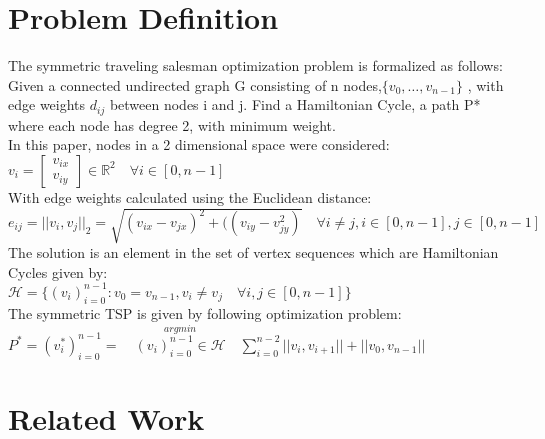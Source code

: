 \documentclass[format=sigconf]{acmart}
\begin{document}
\section*{Problem Definition}
The symmetric traveling salesman optimization problem is formalized as follows:\\
Given a connected undirected graph G consisting of n nodes,$\{v_0, \hdots, v_{n-1}\}$ , with edge weights $d_{ij}$ between nodes i and j.
Find a Hamiltonian Cycle, a path P* where each node has degree 2, with minimum weight.\\
In this paper, nodes in a 2 dimensional space were considered: $v_i = \begin{bmatrix}
v_{ix} \\ v_{iy} 
\end{bmatrix} \in \mathbb{R}^2 \quad \forall i \in [0,n-1]$\\
With edge weights calculated using the Euclidean distance: $e_{ij} = || v_i, v_j ||_2 = \sqrt{(v_{ix}-v_{jx})^2 + ((v_{iy}-v_{jy}^2)} \quad \forall i\neq j, i \in [0,n-1], j \in [0,n-1]$\\
The solution is an element in the set of vertex sequences which are Hamiltonian Cycles given by:\\
$\mathcal{H} = \{ (v_i)_{i=0}^{n-1} : v_0 = v_{n-1}, v_i \neq v_j \quad \forall i,j \in [0,n-1]\}$\\
The symmetric TSP is given by following optimization problem:\\ 
$P^*=(v^*_i)_{i=0}^{n-1} =\quad  \stackrel{argmin}{(v_i)_{i=0}^{n-1} \in \mathcal{H}} \quad \sum_{i=0}^{n-2} ||v_i, v_{i+1} || + ||v_0, v_{n-1} || $
\section*{Related Work}
\end{document}
